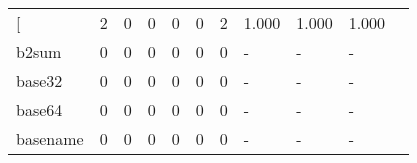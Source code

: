 \begin{longtable}{lp{1.2cm}p{1.2cm}p{1.2cm}p{1.2cm}p{1.2cm}p{1.2cm}p{1.2cm}p{1.2cm}p{1.2cm}p{1.2cm}}
\bottomrule
\endlastfoot
{[}         &                                     2 &                                                  0 &                                                  0 &                                                  0 &                                                  0 &                                                  2 &                                              1.000 &                                              1.000 &                                              1.000 \\
b2sum     &                                     0 &                                                  0 &                                                  0 &                                                  0 &                                                  0 &                                                  0 &                                                  - &                                                  - &                                                  - \\
base32    &                                     0 &                                                  0 &                                                  0 &                                                  0 &                                                  0 &                                                  0 &                                                  - &                                                  - &                                                  - \\
base64    &                                     0 &                                                  0 &                                                  0 &                                                  0 &                                                  0 &                                                  0 &                                                  - &                                                  - &                                                  - \\
basename  &                                     0 &                                                  0 &                                                  0 &                                                  0 &                                                  0 &                                                  0 &                                                  - &                                                  - &                                                  - \\

\end{longtable}
